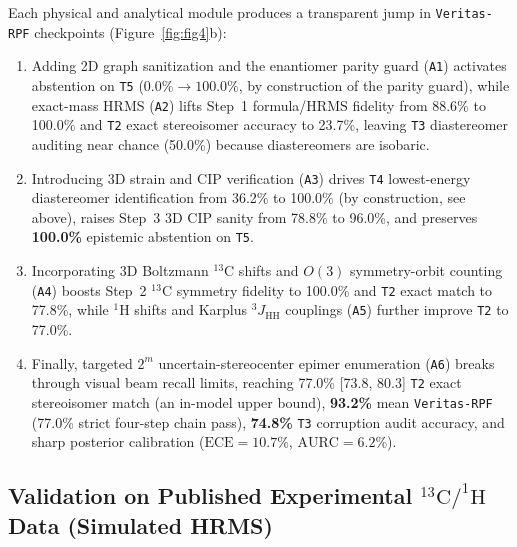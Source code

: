 \documentclass[10pt,twocolumn]{article}
\begin{document}
Each physical and analytical module produces a transparent jump in \texttt{Veritas-RPF} checkpoints (Figure~\ref{fig:fig4}b):
\begin{enumerate}
  \item Adding 2D graph sanitization and the enantiomer parity guard (\texttt{A1}) activates abstention on \texttt{T5} ($0.0\% \to 100.0\%$, by construction of the parity guard), while exact-mass HRMS (\texttt{A2}) lifts Step~1 formula/HRMS fidelity from 88.6\% to 100.0\% and \texttt{T2} exact stereoisomer accuracy to 23.7\%, leaving \texttt{T3} diastereomer auditing near chance (50.0\%) because diastereomers are isobaric.
  \item Introducing 3D strain and CIP verification (\texttt{A3}) drives \texttt{T4} lowest-energy diastereomer identification from 36.2\% to 100.0\% (by construction, see above), raises Step~3 3D CIP sanity from 78.8\% to 96.0\%, and preserves \textbf{100.0\%} epistemic abstention on \texttt{T5}.
  \item Incorporating 3D Boltzmann $^{13}\text{C}$ shifts and $O(3)$ symmetry-orbit counting (\texttt{A4}) boosts Step~2 $^{13}\text{C}$ symmetry fidelity to 100.0\% and \texttt{T2} exact match to 77.8\%, while $^{1}\text{H}$ shifts and Karplus $^3J_{\text{HH}}$ couplings (\texttt{A5}) further improve \texttt{T2} to 77.0\%.
  \item Finally, targeted $2^m$ uncertain-stereocenter epimer enumeration (\texttt{A6}) breaks through visual beam recall limits, reaching 77.0\% [73.8, 80.3] \texttt{T2} exact stereoisomer match (an in-model upper bound), \textbf{93.2\%} mean \texttt{Veritas-RPF} (77.0\% strict four-step chain pass), \textbf{74.8\%} \texttt{T3} corruption audit accuracy, and sharp posterior calibration ($\text{ECE} = 10.7\%$, $\text{AURC} = 6.2\%$).
\end{enumerate}

\subsection{Validation on Published Experimental $^{13}\text{C}/^{1}\text{H}$ Data (Simulated HRMS)}
\label{sec:res_tier2}
\end{document}
